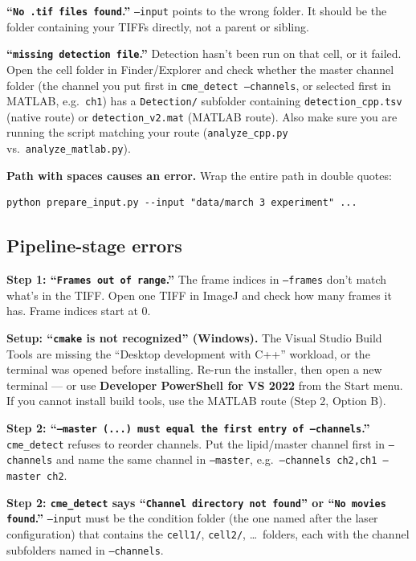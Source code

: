 \documentclass[11pt]{article}
\newcommand{\code}[1]{\texttt{#1}}
\begin{document}
\textbf{``\code{No .tif files found}.''} \code{--input} points to
the wrong folder. It should be the folder containing your TIFFs
directly, not a parent or sibling.

\textbf{``\code{missing detection file}.''} Detection hasn't been run
on that cell, or it failed. Open the cell folder in Finder/Explorer
and check whether the master channel folder (the channel you put
first in \code{cme\_detect --channels}, or selected first in MATLAB,
e.g.\ \code{ch1}) has a \code{Detection/} subfolder containing
\code{detection\_cpp.tsv} (native route) or \code{detection\_v2.mat}
(MATLAB route). Also make sure you are running the script matching
your route (\code{analyze\_cpp.py} vs.\ \code{analyze\_matlab.py}).

\textbf{Path with spaces causes an error.} Wrap the entire path in
double quotes:

\begin{lstlisting}
python prepare_input.py --input "data/march 3 experiment" ...
\end{lstlisting}

\subsection{Pipeline-stage errors}

\textbf{Step 1: ``\code{Frames out of range}.''} The frame indices
in \code{--frames} don't match what's in the TIFF. Open one TIFF in
ImageJ and check how many frames it has. Frame indices start at 0.

\textbf{Setup: ``\code{cmake} is not recognized'' (Windows).} The
Visual Studio Build Tools are missing the ``Desktop development with
C++'' workload, or the terminal was opened before installing. Re-run
the installer, then open a new terminal --- or use \textbf{Developer
PowerShell for VS 2022} from the Start menu. If you cannot install
build tools, use the MATLAB route (Step 2, Option B).

\textbf{Step 2: ``\code{--master (...) must equal the first entry of
--channels}.''} \code{cme\_detect} refuses to reorder channels. Put
the lipid/master channel first in \code{--channels} and name the same
channel in \code{--master}, e.g.\ \code{--channels ch2,ch1 --master
ch2}.

\textbf{Step 2: \code{cme\_detect} says ``\code{Channel directory not
found}'' or ``\code{No movies found}.''} \code{--input} must be the
condition folder (the one named after the laser configuration) that
contains the \code{cell1/}, \code{cell2/}, \ldots\ folders, each with
the channel subfolders named in \code{--channels}.
\end{document}
